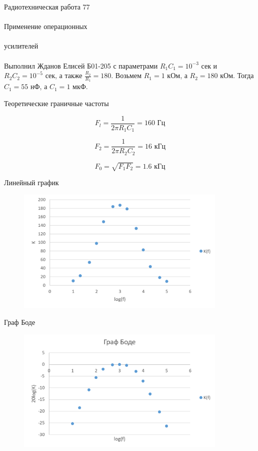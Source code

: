 \documentclass{astroedu-lab}
\begin{document}
\begin{problem}{\huge Радиотехническая работа 77\\\\Применение операционных\\\\усилителей\\\\Выполнил Жданов Елисей Б01-205}
с параметрами $R_1 C_1 = 10^{-3}$ сек и $R_2 C_2 = 10^{-5}$ сек, а также $\frac{R_2}{R_1} = 180$. Возьмем $R_1 = 1$ кОм, а $R_2 = 180$ кОм. Тогда $C_1 = 55$ нФ, а $C_1 = 1$ мкФ. 

Теоретические граничные частоты

\begin{equation}
	F_l = \frac{1}{2 \pi R_1 C_1} = 160 \text{ Гц}
\end{equation}

\begin{equation}
	F_2 = \frac{1}{2 \pi R_2 C_2} = 16 \text{ кГц}
\end{equation}

\begin{equation}
	F_0 = \sqrt{F_1 F_2} = 1.6 \text{ кГц}
\end{equation}

Линейный график

\begin{figure}[!h]
	\centering
	\includegraphics[width=0.9\textwidth]{bglin.png}
	\label{fig:boiler}
\end{figure}

Граф Боде

\begin{figure}[!h]
	\centering
	\includegraphics[width=0.9\textwidth]{bglog.png}
	\label{fig:boiler}
\end{figure}


\end{problem}
\end{document}
